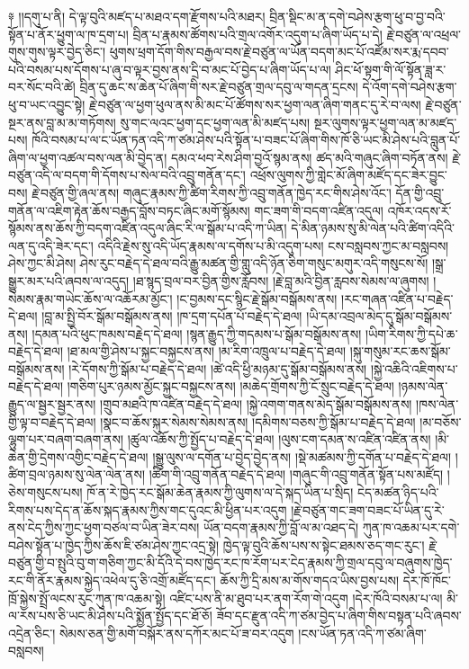 \documentclass{article}
\begin{document}
༈ །།དགུ་པ་ནི། དེ་ལྟ་བུའི་མཛད་པ་མཐའ་དག་རྫོགས་པའི་མཐར། བྲིན་སྡིང་མ་ན་དགེ་བཤེས་རྩག་ཕུ་བ་བྱ་བའི་སྟོན་པ་ནོར་ཕྱུག་ལ་ཁ་དྲག་པ། བྲིན་པ་རྣམས་ཚོགས་པའི་གྲལ་འགོར་འདུག་པ་ཞིག་ཡོད་པ་དེ། རྗེ་བཙུན་ལ་འཕྲལ་གུས་གུས་ལྟར་བྱེད་ཅིང་། ཕུགས་ཕྲག་དོག་གིས་བརྒྱལ་བས་རྗེ་བཙུན་ལ་ཡོན་བདག་མང་པོ་འཛོམ་སར་རྨ་དབབ་པའི་བསམ་པས་དོགས་པ་ཞུ་བ་ལྟར་བྱས་ནས་དྲི་བ་མང་པོ་བྱེད་པ་ཞིག་ཡོད་པ་ལ། ཤིང་ཕོ་སྟག་གི་ལོ་སྟོན་ཟླ་ར་བར་སོང་བའི་ཚེ། བྲིན་དུ་ཆང་ས་ཆེན་པོ་ཞིག་གི་སར་རྗེ་བཙུན་གྲལ་དབུ་ལ་གདན་དྲངས། དེ་འོག་དགེ་བཤེས་རྩག་ཕུ་བ་ཡང་འབྱུང་སྟེ། རྗེ་བཙུན་ལ་ཕྱག་ཕུལ་ནས་མི་མང་པོ་ཚོགས་སར་ཕྱག་ལན་ཞིག་གནང་དུ་རེ་བ་ལས། རྗེ་བཙུན་སྔར་ནས་བླ་མ་མ་གཏོགས། སུ་གང་ལའང་ཕྱག་དང་ཕྱག་ལན་མི་མཛད་པས། སྔར་ལུགས་ལྟར་ཕྱག་ལན་མ་མཛད་པས། ཁོའི་བསམ་པ་ལ་ང་ཡོན་ཏན་འདི་ཀ་ཙམ་ཤེས་པའི་སྟོན་པ་བཟང་པོ་ཞིག་གིས་ཁོ་ཅི་ཡང་མི་ཤེས་པའི་བླུན་པོ་ཞིག་ལ་ཕྱག་འཚལ་བས་ལན་མི་བྱེད་ན། དམའ་ཕབ་རེས་ཤིག་བྱའོ་སྙམ་ནས། ཚད་མའི་གཞུང་ཞིག་བཏོན་ནས། རྗེ་བཙུན་འདི་ལ་བདག་གི་དོགས་པ་སེལ་བའི་འབྲུ་གནོན་དང་། འཕྲོས་ལུགས་ཀྱི་གླེང་མོ་ཞིག་མཛོད་དང་ཟེར་བྱུང་བས། རྗེ་བཙུན་གྱི་ཞལ་ནས། གཞུང་རྣམས་ཀྱི་ཚིག་རིགས་ཀྱི་འབྲུ་གནོན་ཁྱེད་རང་གིས་ཤེས་འོང་། དོན་གྱི་འབྲུ་གནོན་ལ་འཇིག་རྟེན་ཆོས་བརྒྱད་བློས་བཏང་ཞིང་མགོ་སྙོམས། གང་ཟག་གི་བདག་འཛིན་འདུལ། འཁོར་འདས་རོ་སྙོམས་ནས་ཆོས་ཀྱི་བདག་འཛིན་འདུལ་ཞིང་རི་ལ་སྒོམ་པ་འདི་ཀ་ཡིན། དེ་མིན་ཉམས་སུ་མི་ལེན་པའི་ཚིག་འདིའི་ལན་དུ་འདི་ཟེར་དང་། འདིའི་རྗེས་སུ་འདི་ཡོད་རྣམས་ལ་དགོས་པ་མི་འདུག་པས། ངས་བསླབས་ཀྱང་མ་བསླབས། ཤེས་ཀྱང་མི་ཤེས། ཤེས་རུང་བརྗེད་དེ་ཐལ་བའི་རྒྱུ་མཚན་གྱི་གླུ་འདི་ཉོན་ཅིག་གསུང་མགུར་འདི་གསུངས་སོ། །སྒྲ་སྒྱུར་མར་པའི་ཞབས་ལ་འདུད། །ཐ་སྙད་བྲལ་བར་བྱིན་གྱིས་རློབས། །རྗེ་བླ་མའི་བྱིན་རླབས་སེམས་ལ་ཞུགས། །སེམས་རྣམ་གཡེང་ཆོས་ལ་འཆོརམ་མྱོང་། །ང་བྱམས་དང་སྙིང་རྗེ་སྒོམ་བསྒོམས་ནས། །རང་གཞན་འཛིན་པ་བརྗེད་དེ་ཐལ། །བླ་མ་སྤྱི་བོར་སྒོམ་བསྒོམས་ནས། །ཁ་དྲག་དཔོན་པོ་བརྗེད་དེ་ཐལ། །ཡི་དམ་འབྲལ་མེད་དུ་སྒོམ་བསྒོམས་ནས། །དམན་པའི་ཕུང་ཁམས་བརྗེད་དེ་ཐལ། །སྙན་རྒྱུད་ཀྱི་གདམས་པ་སྒོམ་བསྒོམས་ནས། །ཡིག་རིགས་ཀྱི་དཔེ་ཆ་བརྗེད་དེ་ཐལ། །ཐ་མལ་གྱི་ཤེས་པ་སྐྱང་བསྐྱངས་ནས། །མ་རིག་འཁྲུལ་པ་བརྗེད་དེ་ཐལ། །སྐུ་གསུམ་རང་ཆས་སྒོམ་བསྒོམས་ནས། །རེ་དོགས་ཀྱི་སྒོམ་པ་བརྗེད་དེ་ཐལ། །ཚེ་འདི་ཕྱི་མཉམ་དུ་སྒོམ་བསྒོམས་ནས། །སྐྱེ་འཆིའི་འཇིགས་པ་བརྗེད་དེ་ཐལ། །གཅིག་པུར་ཉམས་མྱོང་སྐྱང་བསྐྱངས་ནས། །མཆེད་གྲོགས་ཀྱི་ངོ་སྲུང་བརྗེད་དེ་ཐལ། །ཉམས་ལེན་རྒྱུད་ལ་སྦྱར་སྦྱར་ནས། །གྲུབ་མཐའི་ཁ་འཛིན་བརྗེད་དེ་ཐལ། །སྐྱེ་འགག་གནས་མེད་སྒོམ་བསྒོམས་ནས། །ཁས་ལེན་གྱི་ལྟ་བ་བརྗེད་དེ་ཐལ། །སྣང་བ་ཆོས་སྐུར་སེམས་སེམས་ནས། །དམིགས་བཅས་ཀྱི་སྒོམ་པ་བརྗེད་དེ་ཐལ། །མ་བཅོས་ལྷུག་པར་བཞག་བཞག་ནས། །ཚུལ་འཆོས་ཀྱི་སྤྱོད་པ་བརྗེད་དེ་ཐལ། །ལུས་ངག་དམན་ས་འཛིན་འཛིན་ནས། །མི་ཆེན་གྱི་དྲེགས་འགྱིང་བརྗེད་དེ་ཐལ། །སྒྱུ་ལུས་ལ་དགོན་པ་བྱེད་བྱེད་ནས། །སྡེ་མཚམས་ཀྱི་དགོན་པ་བརྗེད་དེ་ཐལ། །ཚིག་བྲལ་ཉམས་སུ་ལེན་ལེན་ནས། །ཚིག་གི་འབྲུ་གནོན་བརྗེད་དེ་ཐལ། །གཞུང་གི་འབྲུ་གནོན་སྟོན་པས་མཛོད། །ཅེས་གསུངས་པས། ཁོ་ན་རེ་ཁྱེད་རང་སྒོམ་ཆེན་རྣམས་ཀྱི་ལུགས་ལ་དེ་སྐད་ཡིན་པ་སྲིད། ངེད་མཚན་ཉིད་པའི་རིགས་པས་དེད་ན་ཆོས་སྐད་རྣམས་ཀྱིས་གང་དུའང་མི་ཕྱིན་པར་འདུག །རྗེ་བཙུན་གང་ཟག་བཟང་པོ་ཡིན་དུ་རེ་ནས་ངེད་ཀྱིས་ཀྱང་ཕྱག་བཙལ་བ་ཡིན་ཟེར་བས། ཡོན་བདག་རྣམས་ཀྱི་བློ་ལ་མ་འཐད་དེ། ཀུན་ཁ་འཆམ་པར་དགེ་བཤེས་སྟོན་པ་ཁྱེད་ཀྱིས་ཆོས་ཇི་ཙམ་ཤེས་ཀྱང་འདྲ་སྟེ། ཁྱེད་ལྟ་བུའི་ཆོས་པས་ས་སྟེང་ཐམས་ཅད་གང་རུང་། རྗེ་བཙུན་གྱི་བ་སྤུའི་བུ་ག་གཅིག་ཀྱང་མི་དོའི་དེ་བས་ཁྱེད་རང་ཁ་རོག་པར་ངེད་རྣམས་ཀྱི་གྲལ་དབུ་ལ་བཞུགས་ཁྱེད་རང་གི་ནོར་རྣམས་སྐྱེད་འཕེལ་དུ་ཅི་འགྲོ་མཛོད་དང་། ཆོས་ཀྱི་དྲི་མས་མ་གོས་གདའ་ཡིས་བྱས་པས། དེར་ཁོ་ཁོང་ཁྲོ་སྐྱེས་སྤྲོ་ལངས་རུང་ཀུན་ཁ་འཆམ་སྟེ། འཛིང་པས་ནི་མ་ཐུབ་པར་ནག་རོག་གེ་འདུག །དེར་ཁོའི་བསམ་པ་ལ། མི་ལ་རས་པས་ཅི་ཡང་མི་ཤེས་པའི་སྨྱོན་སྤྱོད་དང་ཐོ་ཅོ། ཟོབ་དང་རྫུན་འདི་ཀ་ཙམ་བྱེད་པ་ཞིག་གིས་བསྟན་པའི་ཞབས་འདྲེན་ཅིང་། སེམས་ཅན་གྱི་མགོ་བསྐོར་ནས་དཀོར་མང་པོ་ཟ་བར་འདུག །ངས་ཡོན་ཏན་འདི་ཀ་ཙམ་ཞིག་བསླབས། 
\end{document}
